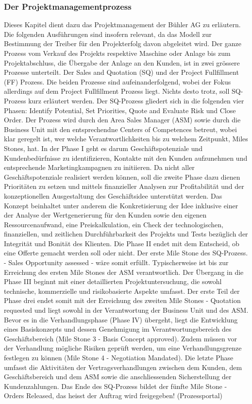 \documentclass[11pt]{article}
\begin{document}
\subsubsection{Der Projektmanagementprozess}\label{zweieins}

Dieses Kapitel dient dazu das Projektmanagement der Bühler AG zu erläutern. Die folgenden Ausführungen sind insofern relevant, da das Modell zur Bestimmung der Treiber für den Projekterfolg davon abgeleitet wird. 
\newline
Der ganze Prozess vom Verkauf des Projekts respektive Maschine oder Anlage bis zum Projektabschluss, die Übergabe der Anlage an den Kunden, ist in zwei grössere Prozesse unterteilt. Der Sales and Quotation (SQ) und der Project Fullfillment (FF) Prozess. Die beiden Prozesse sind aufeinanderfolgend, wobei der Fokus allerdings auf dem Project Fullfillment Prozess liegt. Nichts desto trotz, soll SQ-Prozess kurz erläutert werden. Der SQ-Prozess gliedert sich in die folgenden vier Phasen: Identify Potential, Set Priorities, Quote and Evaluate Risk und Close Order. Der Prozess wird durch den Area Sales Manager (ASM) sowie durch die Business Unit mit den entsprechendne Centers of Competences betreut, wobei klar geregelt ist, wer welche Verantwortlichkeiten bis zu welchem Zeitpunkt, Miles Stones, hat. In der Phase I geht es darum Geschäftspotenziale und Kundenbedürfnisse zu identifizieren, Kontakte mit den Kunden aufzunehmen und entsprechende Marketingkampagnen zu initiieren. Da nicht aller Geschäftspotenziale realisiert werden können, soll die zweite Phase dazu dienen Prioritäten zu setzen und mittels finanzieller Analysen zur Profitabilität und der konzeptionellen Ausgestaltung des Geschäftsidee unterstützt werden. Das Konzept beinhaltet unter anderem die Konkretisierung der Idee inklusive einer der Analyse der Wertgenerierung für den Kunden sowie den eigenen Ressourcenaufwand, eine Preiskalkulation, ein Check der technologischen, finanziellen, und zeitlichen Durchführbarkeit des Projekts und Tests bezüglich der Integrität und Bonität des Klienten. Die Phase II endet mit dem Entscheid, ob eine Offerte gemacht werden soll oder nicht. Der erste Mile Stone des SQ-Prozess. - Sales Opportunity assessed -  wäre somit erfüllt. Typischerweise ist bis zur Erreichung des ersten Mile Stones der ASM verantwortlich. Der Übergang in die Phase III beginnt mit einer detaillierten Projektuntersuchung, die sowohl technische, kommerzielle und risikobasierte Aspekte umfasst. Der erste Teil der Phase drei endet somit mit der Erreichung des zweiten Mile Stones  - Quotation requested und liegt sowohl in der Verantwortung der Business Unit und des ASM. Bevor es in die Verhandlungsphase (Phase IV) übergeht, liegt die Entwicklung eines Basiskonzepts und dessen Genehmigung im Verantwortungsbereich des Geschäftsbereich (Mile Stone 3 - Basis Concept approved). Zudem müssen vor der Verhandlung mögliche Risiken geprüft werden, um eine Verhandlungsgrenze festlegen zu können (Mile Stone 4 - Negotiation Mandated). Die letzte Phase umfasst die Aktivitäten der Vertragsverhandlungen zwischen dem Kunden, dem Geschäftsbereich und dem ASM sowie die anschliessenden Sicherstellung der Kundenzahlungen. Das Ende des SQ-Prozess bildet der fünfte Mile Stone -  Orders Released, das heisst der Auftrag wird freigegeben! (Prozessportal)
\end{document}
